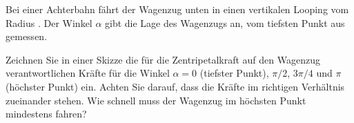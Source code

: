 Bei einer Achterbahn fährt der Wagenzug unten in einen vertikalen Looping vom Radius \rLpO. Der Winkel $\alpha$ gibt die Lage des Wagenzugs an, vom tiefsten Punkt aus gemessen.

\begin{center}
\end{center}

\begin{abcliste}
\abc Zeichnen Sie in einer Skizze die für die Zentripetalkraft auf den Wagenzug verantwortlichen Kräfte für die Winkel $\alpha = 0$ (tiefster Punkt), $\pi/2$, $3\pi/4$ und $\pi$ (höchster Punkt) ein. Achten Sie darauf, dass die Kräfte im richtigen Verhältnis zueinander stehen.
\abc Wie schnell muss der Wagenzug im höchsten Punkt mindestens fahren?
\end{abcliste}
